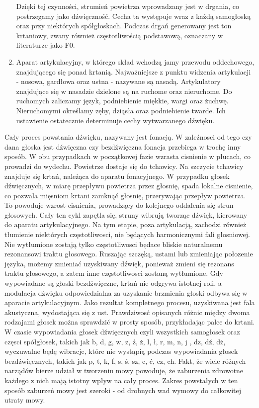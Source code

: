 \documentclass[a4paper,12 pt]{article}
\begin{document}
\begin{enumerate}
\begin{figure}[!htbp]
\end{figure}
\FloatBarrier

Dzięki tej czynności, strumień powietrza wprowadzany jest w drgania, co postrzegamy jako dźwięczność. Cecha ta występuje wraz z każdą samogłoską oraz przy niektórych spółgłoskach. Podczas drgań generowany jest ton krtaniowy, zwany również częstotliwością podstawową, oznaczany w literaturze jako F0. 
\item Aparat artykulacyjny, w którego skład wchodzą jamy przewodu oddechowego, znajdującego się ponad krtanią. Najważniejsze z punktu widzenia artykulacji - nosowa, gardłowa oraz ustna - nazywane są nasadą. Artykulatory znajdujące się w nasadzie dzielone są na ruchome oraz nieruchome. Do ruchomych zaliczamy język, podniebienie miękkie, wargi oraz żuchwę. Nieruchomymi określamy zęby, dziąsła oraz podniebienie twarde. Ich ustawienie ostatecznie determinuje cechy wytwarzanego dźwięku. 
\end{enumerate}
Cały proces powstania dźwięku, nazywany jest fonacją. W zaleźnosci od tego czy dana głoska jest dźwięczna czy bezdźwięczna fonacja przebiega w trochę inny sposób. W obu przypadkach w początkowej fazie wzrasta cisnienie w płucach, co prowadzi do wydechu. Powietrze dostaje się do tchawicy. Na szczycie tchawicy znajduje się krtań, należąca do aparatu fonacyjnego. W przypadku głosek dźwięcznych, w miarę przepływu powietrza przez głosnię, spada lokalne cisnienie, co pozwala mięsniom krtani zamknąć głosnię, przerywając przepływ powietrza. To powoduje wzrost cisnienia, prowadzący do kolejnego oddalenia się strun głosowych. Cały ten cykl zapętla się, struny wibrują tworząc dźwięk, kierowany do aparatu artykulacyjnego. Na tym etapie, poza artykulacją, zachodzi również tłumienie niektórych częstotliwosci, nie będących harmonicznymi fali głosniowej. Nie wytłumione zostają tylko częstotliwosci będace bliskie naturalnemu rezonansowi traktu głosowego. Ruszając szczęką, ustami lub zmieniając połozenie języka, możemy zmieniać uzyskiwany dźwięk, ponieważ zmieni się rezonans traktu głosowego, a zatem inne częstotliwosci zostaną wytłumione. Gdy wypowiadane są głoski bezdźwięczne, krtań nie odgrywa istotnej roli, a modulacja dźwięku odpowiedzialna za uzyskanie brzmienia głoski odbywa się w aparacie artykulacyjnym. Jako rezultat kompletnego procesu, uzyskiwana jest fala akustyczna, wydostająca się z ust. Prawdziwosć opisanych różnic między dwoma rodzajami głosek można sprawdzić w prosty sposób, przykładając palce do krtani. W czasie wypowiadania głosek dźwięcznych czyli wszystkich samogłosek oraz częsci spółgłosek, takich jak b, d, g, w, z, ź, ż, l, ł, r, m, n, j , dz, dź, dż, wyczuwalne będę wibracje, które nie wystąpią podczas wypowiadania głosek bezdźwięcznych, takich jak p, t, k, f, s, ś, sz, c, ć, cz, ch.
Fakt, że wiele różnych narządów bierze udział w tworzeniu mowy powoduje, że zaburzenia zdrowotne każdego z nich mają istotny wpływ na cały proces. Zakres powstałych w ten sposób zaburzeń mowy jest szeroki - od drobnych wad wymowy do całkowitej utraty mowy.
\end{document}
